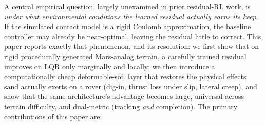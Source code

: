 \documentclass[conference]{IEEEtran}
\begin{document}
A central empirical question, largely unexamined in prior residual-RL work, is \emph{under what environmental conditions the learned residual actually earns its keep}. If the simulated contact model is a rigid Coulomb approximation, the baseline controller may already be near-optimal, leaving the residual little to correct. This paper reports exactly that phenomenon, and its resolution: we first show that on rigid procedurally generated Mars-analog terrain, a carefully trained residual improves on LQR only marginally and locally; we then introduce a computationally cheap deformable-soil layer that restores the physical effects sand actually exerts on a rover (dig-in, thrust loss under slip, lateral creep), and show that the same architecture's advantage becomes large, universal across terrain difficulty, and dual-metric (tracking \emph{and} completion). The primary contributions of this paper are:
\end{document}

